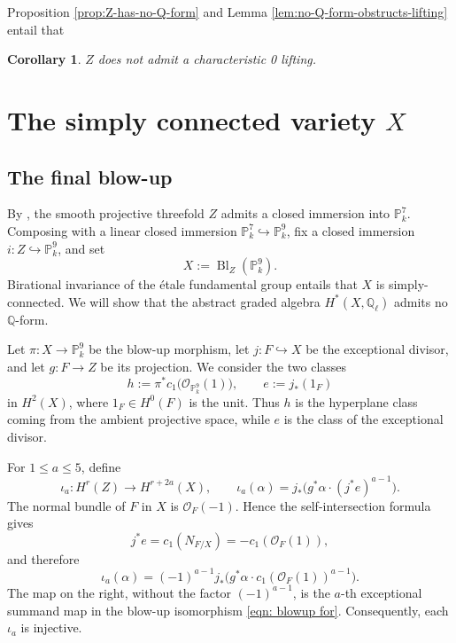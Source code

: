 \documentclass[11pt, reqno]{amsart}
\newtheorem{corollary}[theorem]{Corollary}
\theoremstyle{definition}
\newcommand\QQ{\mathbb{Q}}
\newcommand\PP{\mathbb{P}}
\newcommand\OO{\mathcal{O}}
\DeclareMathOperator{\Bl}{Bl}
\begin{document}
Proposition \ref{prop:Z-has-no-Q-form} and Lemma \ref{lem:no-Q-form-obstructs-lifting} entail that 

\begin{corollary}
$Z$ does not admit a characteristic 0 lifting.    
\end{corollary}



\section{The simply connected variety $X$}
\label{subsec:simply-connected-variety}

\subsection{The final blow-up}
\label{subsubsec:final-blow-up}\;

By \cite[Chapter~II, \S5.4, Theorem~2.25]{Shafarevich-BAG1},
the smooth projective threefold $Z$ admits a closed immersion into
$\PP^7_k$.  Composing with a linear closed immersion
$\PP^7_k\hookrightarrow\PP^9_k$, fix a closed immersion
$i:Z\hookrightarrow\PP^9_k$, and set
\[
X:=\Bl_Z(\PP^9_k).
\]
Birational invariance of the \'etale fundamental group
\cite[Expos\'e~X, Corollaire~3.4]{sga1} entails that $X$ is simply-connected.
We will show that the abstract graded algebra
$H^*(X,\QQ_\ell)$ admits no $\QQ$-form.

Let $\pi:X\to\PP^9_k$ be the blow-up morphism, let
$j:F\hookrightarrow X$ be the exceptional divisor, and let $g:F\to Z$
be its projection.  We consider the two classes
\[
h:=\pi^*c_1\bigl(\OO_{\PP^9_k}(1)\bigr),
\qquad
e:=j_*(1_F)
\]
in $H^2(X)$, where $1_F\in H^0(F)$ is the unit.  Thus $h$ is the
hyperplane class coming from the ambient projective space, while $e$ is
the class of the exceptional divisor.

For $1\leq a\leq 5$, define
\[
\iota_a:H^r(Z)\longrightarrow H^{r+2a}(X),
\qquad
\iota_a(\alpha)
=
j_*\bigl(g^*\alpha\cdot(j^*e)^{a-1}\bigr).
\]
The normal bundle of $F$ in $X$ is $\OO_F(-1)$.  Hence the
self-intersection formula gives
\begin{equation}
\label{eqn: self-int}
    j^*e
=
c_1(N_{F/X})
=
-c_1(\OO_F(1)),
\end{equation}
and therefore
\[
\iota_a(\alpha)
=
(-1)^{a-1}
j_*\bigl(g^*\alpha\cdot c_1(\OO_F(1))^{a-1}\bigr).
\]
The map on the right, without the factor $(-1)^{a-1}$, is the
$a$-th exceptional summand map in the blow-up isomorphism
\eqref{eqn: blowup for}.  Consequently, each $\iota_a$ is injective.
\end{document}
